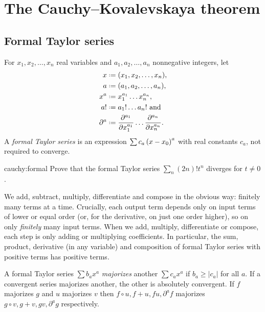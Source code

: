 \chapter{The Cauchy--Kovalevskaya theorem}\label{chapter:Cauchy.Kovalevskaya}%
%
\section{Formal Taylor series}
For \(x_1,x_2,\dots,x_n\) real variables and \(a_1,a_2,\dots,a_n\) nonnegative integers, let
\begin{align*}
x&\defeq(x_1,x_2,\dots,x_n),\\
a&\defeq(a_1,a_2,\dots,a_n),\\ 
x^a&\defeq x_1^{a_1} \dots x_n^{a_n},\\
a!&\defeq a_1!\dots a_n!\text{ and}\\ 
\partial^a&\defeq\frac{\partial^{a_1}}{\partial x_1^{a_1}} \dots \frac{\partial^{a_n}}{\partial x_n^{a_n}}.
\end{align*}
A \emph{formal Taylor series} is an expression \(\sum c_a \left(x-x_0\right)^a\) with real constants \(c_a\), not required to converge.
\begin{problem}{cauchy:formal}
Prove that the formal Taylor series \(\sum_n (2n)! t^n\) diverges for \(t \ne 0\).
\end{problem}
We add, subtract, multiply, differentiate and compose in the obvious way: finitely many terms at a time.
Crucially, each output term depends only on input terms of lower or equal order (or, for the derivative, on just one order higher), so on only \emph{finitely} many input terms.
When we add, multiply, differentiate or compose, each step is only adding or multiplying coefficients.
In particular, the sum, product, derivative (in any variable) and composition of formal Taylor series with positive terms has positive terms.

A formal Taylor series \(\sum b_a x^a\) \emph{majorizes} another \(\sum c_a x^a\) if \(b_a \ge \left|c_a\right|\) for all \(a\).
If a convergent series majorizes another, the other is absolutely convergent.
If \(f\) majorizes \(g\) and \(u\) majorizes \(v\) then \(f \circ u, f+u, fu, \partial^a \! f\) majorizes \(g \circ v, g+v, gv, \partial^a \! g\) respectively. 

